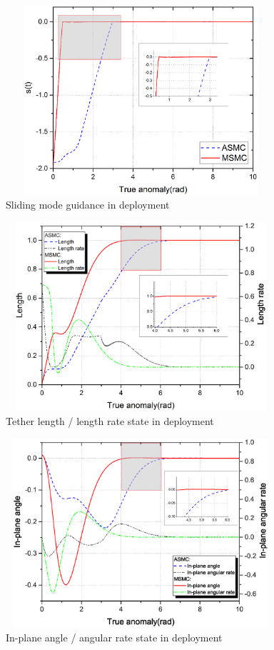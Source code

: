 \documentclass[3p]{elsarticle}
\theoremstyle{plain}
\begin{document}
\begin{figure}
\centering
\includegraphics[width=10cm,height=7cm]{deployment_s(t).eps}
\caption{Sliding mode guidance in deployment}
\label{fig:switch}
\end{figure}

\begin{figure}
\centering
\includegraphics[width=10cm,height=7cm]{deployment_length_and_rate.eps}
\caption{Tether length / length rate state in deployment}
\label{fig:length}
\end{figure}
\begin{figure}
\centering
\includegraphics[width=10cm,height=7cm]{deployment_angle_and_rate.eps}
\caption{In-plane angle / angular rate state in deployment}
\label{fig:theta}
\end{figure}
\end{document}
